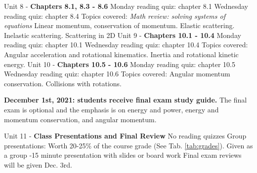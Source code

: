 \documentclass[10pt]{article}
\begin{document}
\begin{outline}[enumerate]
\1 Unit 8 - \textbf{Chapters 8.1, 8.3 - 8.6}
\2 Monday reading quiz: chapter 8.1
\2 Wednesday reading quiz: chapter 8.4
\2 Topics covered:
\3 \textit{Math review: solving systems of equations}
\3 Linear momentum, conservation of momentum.
\3 Elastic scattering.
\3 Inelastic scattering.
\3 Scattering in 2D
\1 Unit 9 - \textbf{Chapters 10.1 - 10.4}
\2 Monday reading quiz: chapter 10.1
\2 Wednesday reading quiz: chapter 10.4
\2 Topics covered:
\3 Angular acceleration and rotational kinematics.
\3 Inertia and rotational kinetic energy.
\1 Unit 10 - \textbf{Chapters 10.5 - 10.6}
\2 Monday reading quiz: chapter 10.5
\2 Wednesday reading quiz: chapter 10.6
\2 Topics covered:
\3 Angular momentum conservation.
\3 Collisions with rotations.

\1 \textbf{December 1st, 2021: students receive final exam study guide.} The final exam is optional and the emphasis is on energy and power, energy and momentum conservation, and angular momentum.

\1 Unit 11 - \textbf{Class Presentations and Final Review}
\2 No reading quizzes
\2 Group presentations:
\3 Worth 20-25\% of the course grade (See Tab. \ref{tab:grades}).
\3 Given as a group
-15 minute presentation with slides or board work
\2 Final exam reviews will be given Dec. 3rd.
\end{outline}
\end{document}
